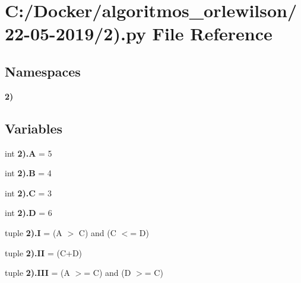 \section{C\+:/\+Docker/algoritmos\+\_\+orlewilson/22-\/05-\/2019/2).py File Reference}
\label{2_08_8py}
\subsection*{Namespaces}
\begin{DoxyCompactItemize}
\item 
 \textbf{ 2)}
\end{DoxyCompactItemize}
\subsection*{Variables}
\begin{DoxyCompactItemize}
\item 
int \textbf{ 2).\+A} = 5
\item 
int \textbf{ 2).\+B} = 4
\item 
int \textbf{ 2).\+C} = 3
\item 
int \textbf{ 2).\+D} = 6
\item 
tuple \textbf{ 2).\+I} = (A $>$ C) and (C $<$= D)
\item 
tuple \textbf{ 2).\+II} = (C+D)
\item 
tuple \textbf{ 2).\+I\+II} = (A $>$= C) and (D $>$= C)
\end{DoxyCompactItemize}
